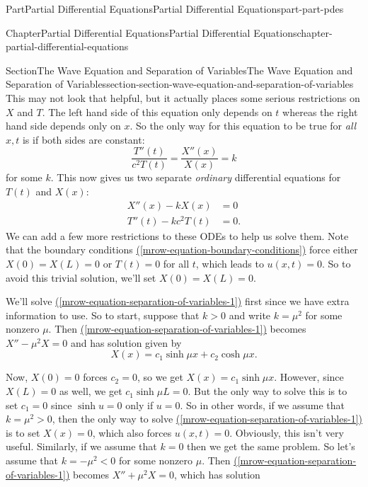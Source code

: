 \documentclass[twoside,10pt,]{book}
\newcommand{\xreffont}{\relax}
\numberwithin{equation}{part}
\newcommand{\lt}{<}
\newcommand{\gt}{>}
\newcommand{\amp}{&}
\begin{document}
\begin{partptx}{Part}{Partial Differential Equations}{}{Partial Differential Equations}{}{}{part-part-pdes}
\begin{chapterptx}{Chapter}{Partial Differential Equations}{}{Partial Differential Equations}{}{}{chapter-partial-differential-equations}
\begin{sectionptx}{Section}{The Wave Equation and Separation of Variables}{}{The Wave Equation and Separation of Variables}{}{}{section-section-wave-equation-and-separation-of-variables}
\begin{equation*}
\end{equation*}
This may not look that helpful, but it actually places some serious restrictions on \(X\) and \(T\). The left hand side of this equation only depends on \(t\) whereas the right hand side depends only on \(x\). So the only way for this equation to be true for \emph{all} \(x,t\) is if both sides are constant:%
\begin{equation*}
\frac{T''(t)}{c^{2}T(t)} = \frac{X''(x)}{X(x)} = k
\end{equation*}
for some \(k\). This now gives us two separate \emph{ordinary} differential equations for \(T(t)\) and \(X(x)\):%
%
\begin{align}
X''(x) - kX(x) \amp = 0 \label{mrow-equation-separation-of-variables-1}\\
T''(t) - kc^{2}T(t) \amp = 0\text{.}\label{mrow-equation-separation-of-variables-2}
\end{align}
We can add a few more restrictions to these ODEs to help us solve them. Note that the boundary conditions \hyperref[mrow-equation-boundary-conditions]{({\xreffont\ref{mrow-equation-boundary-conditions}})} force either \(X(0) = X(L) = 0\) or \(T(t) = 0\) for all \(t\), which leads to \(u(x,t) = 0\). So to avoid this trivial solution, we'll set \(X(0) = X(L) = 0\).%
\par
We'll solve \hyperref[mrow-equation-separation-of-variables-1]{({\xreffont\ref{mrow-equation-separation-of-variables-1}})} first since we have extra information to use. So to start, suppose that \(k>0\) and write \(k = \mu^{2}\) for some nonzero \(\mu\). Then \hyperref[mrow-equation-separation-of-variables-1]{({\xreffont\ref{mrow-equation-separation-of-variables-1}})} becomes \(X''-\mu^{2}X = 0\) and has solution given by%
\begin{equation*}
X(x) = c_{1}\sinh\mu x + c_{2}\cosh \mu x.
\end{equation*}
%
\par
Now, \(X(0)=0\) forces \(c_{2} = 0\), so we get \(X(x) = c_{1}\sinh\mu x\). However, since \(X(L) = 0\) as well, we get \(c_{1}\sinh\mu L = 0\). But the only way to solve this is to set \(c_{1} = 0\) since \(\sinh u = 0\) only if \(u=0\). So in other words, if we assume that \(k = \mu^{2}\gt0\), then the only way to solve \hyperref[mrow-equation-separation-of-variables-1]{({\xreffont\ref{mrow-equation-separation-of-variables-1}})} is to set \(X(x) = 0\), which also forces \(u(x,t) = 0\). Obviously, this isn't very useful. Similarly, if we assume that \(k=0\) then we get the same problem. So let's assume that \(k=-\mu^{2}\lt0\) for some nonzero \(\mu\). Then \hyperref[mrow-equation-separation-of-variables-1]{({\xreffont\ref{mrow-equation-separation-of-variables-1}})} becomes \(X''+\mu^{2}X = 0\), which has solution%

\end{sectionptx}
\end{chapterptx}
\end{partptx}
\end{document}
